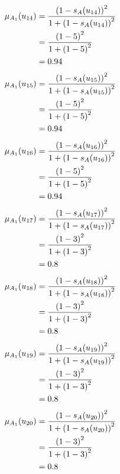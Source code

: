 \documentclass[a4paper]{book}
\begin{document}
				\begin{align}
					\mu_{A_1}(u_{14}) &= \frac{\left(1-s_A(u_{14})\right)^2}{1 + \left(1-s_A(u_{14})\right)^2}\\
					&= \frac{\left(1-5\right)^2}{1 + \left(1-5\right)^2} \notag \\
					&= 0.94 \notag
				\end{align}
				\begin{align}
					\mu_{A_1}(u_{15}) &= \frac{\left(1-s_A(u_{15})\right)^2}{1 + \left(1-s_A(u_{15})\right)^2}\\
					&= \frac{\left(1-5\right)^2}{1 + \left(1-5\right)^2} \notag \\
					&= 0.94 \notag
				\end{align}
				\begin{align}
					\mu_{A_1}(u_{16}) &= \frac{\left(1-s_A(u_{16})\right)^2}{1 + \left(1-s_A(u_{16})\right)^2}\\
					&= \frac{\left(1-5\right)^2}{1 + \left(1-5\right)^2} \notag \\
					&= 0.94 \notag
				\end{align}
				\begin{align}
					\mu_{A_1}(u_{17}) &= \frac{\left(1-s_A(u_{17})\right)^2}{1 + \left(1-s_A(u_{17})\right)^2}\\
					&= \frac{\left(1-3\right)^2}{1 + \left(1-3\right)^2} \notag \\
					&= 0.8 \notag
				\end{align}
				\begin{align}
					\mu_{A_1}(u_{18}) &= \frac{\left(1-s_A(u_{18})\right)^2}{1 + \left(1-s_A(u_{18})\right)^2}\\
					&= \frac{\left(1-3\right)^2}{1 + \left(1-3\right)^2} \notag \\
					&= 0.8 \notag
				\end{align}
				\begin{align}
					\mu_{A_1}(u_{19}) &= \frac{\left(1-s_A(u_{19})\right)^2}{1 + \left(1-s_A(u_{19})\right)^2}\\
					&= \frac{\left(1-3\right)^2}{1 + \left(1-3\right)^2} \notag \\
					&= 0.8 \notag
				\end{align}
				\begin{align}
					\mu_{A_1}(u_{20}) &= \frac{\left(1-s_A(u_{20})\right)^2}{1 + \left(1-s_A(u_{20})\right)^2}\\
					&= \frac{\left(1-3\right)^2}{1 + \left(1-3\right)^2} \notag \\
					&= 0.8 \notag
				\end{align}
\end{document}
